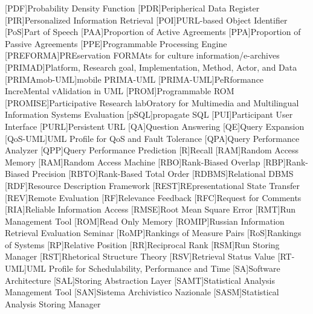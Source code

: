 [PDF]{Probability Density Function}
[PDR]{Peripherical Data Register}
[PIR]{Personalized Information Retrieval}
[POI]{\acs{PURL}-based Object Identifier}
[PoS]{Part of Speech}
[PAA]{Proportion of Active Agreements}
[PPA]{Proportion of Passive Agreements}
[PPE]{Programmable Processing Engine}
[PREFORMA]{PREservation FORMAts for culture information/e-archives}
[PRIMAD]{Platform, Research goal, Implementation, Method, Actor, and Data}
[PRIMAmob-UML]{mobile \acs{PRIMA-UML}}
[PRIMA-UML]{PeRformance IncreMental vAlidation in \acs{UML}}
[PROM]{Programmable \acs{ROM}}
[PROMISE]{Participative Research labOratory  for Multimedia and Multilingual Information Systems Evaluation}
[pSQL]{propagate \acs{SQL}}
[PUI]{Participant User Interface}
[PURL]{Persistent \acs{URL}}
[QA]{Question Answering}
[QE]{Query Expansion}
[QoS-UML]{\acs{UML} Profile for QoS and Fault Tolerance}
[QPA]{Query Performance Analyzer}
[QPP]{Query Performance Prediction}
[R]{Recall}
[RAM]{Random Access Memory}
[RAM]{Random Access Machine}
[RBO]{Rank-Biased Overlap}
[RBP]{Rank-Biased Precision}
[RBTO]{Rank-Based Total Order}
[RDBMS]{Relational \acs{DBMS}}
[RDF]{Resource Description Framework}
[REST]{REpresentational State Transfer}
[REV]{Remote Evaluation}
[RF]{Relevance Feedback}
[RFC]{Request for Comments}
[RIA]{Reliable Information Access}
[RMSE]{Root Mean Square Error}
[RMT]{Run Management Tool}
[ROM]{Read Only Memory}
[ROMIP]{Russian Information Retrieval Evaluation Seminar}
[RoMP]{Rankings of Measure Pairs}
[RoS]{Rankings of Systems}
[RP]{Relative Position}
[RR]{Reciprocal Rank}
[RSM]{Run Storing Manager}
[RST]{Rhetorical Structure Theory}
[RSV]{Retrieval Status Value}
[RT-UML]{\acs{UML} Profile for Schedulability, Performance and Time}
[SA]{Software Architecture}
[SAL]{Storing Abstraction Layer}
[SAMT]{Statistical Analysis Management Tool}
[SAN]{Sistema Archivistico Nazionale}
[SASM]{Statistical Analysis Storing Manager}
